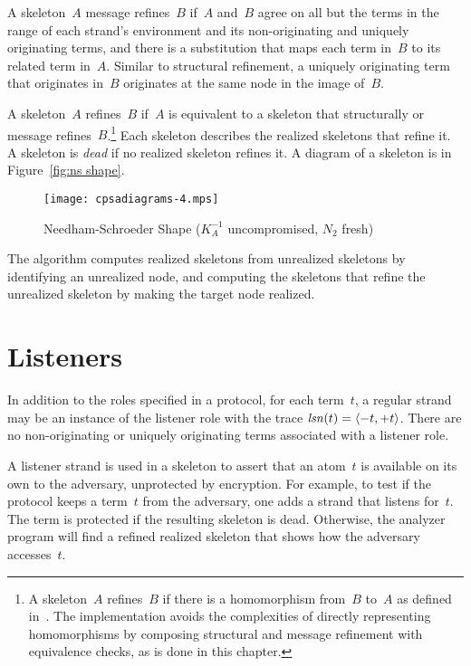 \documentclass[12pt]{article}
\begin{document}
A skeleton~$A$ message refines~$B$ if~$A$ and~$B$ agree on all but the
terms in the range of each strand's environment and its
non-originating and uniquely originating terms, and there is a
substitution that maps each term in~$B$ to its related term in~$A$.
Similar to structural refinement, a uniquely originating term that
originates in~$B$ originates at the same node in the image of~$B$.

A skeleton~$A$ refines~$B$ if~$A$ is equivalent to a
skeleton that structurally or message refines~$B$.\footnote{A
  skeleton~$A$ refines~$B$ if there is a homomorphism from~$B$ to~$A$
  as defined in~\cite{DoghmiGuttmanThayer07}.  The implementation
  avoids the complexities of directly representing homomorphisms by
  composing structural and message refinement with equivalence checks,
  as is done in this chapter.}  Each skeleton describes the realized
skeletons that refine it.  A skeleton is \emph{dead} if no realized
skeleton refines it.  A diagram of a skeleton is in Figure~\ref{fig:ns
  shape}.

\begin{figure}
\begin{center}
\texttt{[image: cpsadiagrams-4.mps]}
\caption{Needham-Schroeder Shape ($K^{-1}_A$ uncompromised, $N_2$ fresh)}
\label{fig:ns shape}
\end{center}
\end{figure}

The {\cpsa} algorithm computes realized skeletons from unrealized
skeletons by identifying an unrealized node, and computing the
skeletons that refine the unrealized skeleton by making the target
node realized.

\section{Listeners}

In addition to the roles specified in a protocol, for each term~$t$, a
regular strand may be an instance of the listener role with the trace
$\operatorname{\mathit{lsn}}(t) = \langle\mathord - t, \mathord + t\rangle$.  There are no non-originating or
uniquely originating terms associated with a listener role.

A listener strand is used in a skeleton to assert that an atom~$t$ is
available on its own to the adversary, unprotected by encryption.  For
example, to test if the protocol keeps a term~$t$ from the adversary,
one adds a strand that listens for~$t$.  The term is protected if the
resulting skeleton is dead.  Otherwise, the {\cpsa} analyzer program
will find a refined realized skeleton that shows how the adversary
accesses~$t$.
\end{document}
